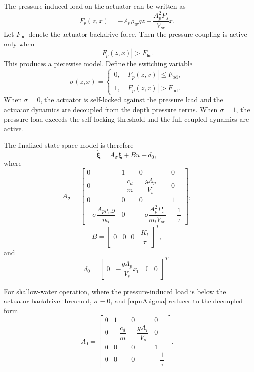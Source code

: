 ﻿\documentclass[subscriptcorrection,upint,varvw,barcolor=Goldenrod3,mathalfa=cal=euler,balance,hyphenate,french,pdf-a]{asmejour}
\begin{document}
The pressure-induced load on the actuator can be written as
\begin{equation}
    F_p(z,x)=-A_p\rho_wgz-\frac{A_p^2P_s}{V_{se}}x.
    \label{eqn:pressure_load}
\end{equation}
Let \(F_{\mathrm{bd}}\) denote the actuator backdrive force. Then the pressure coupling is active only when
\[
    |F_p(z,x)|>F_{\mathrm{bd}}.
\]
This produces a piecewise model. Define the switching variable
\begin{equation}
    \sigma(z,x)=
    \begin{cases}
        0, & |F_p(z,x)|\leq F_{\mathrm{bd}},\\
        1, & |F_p(z,x)|>F_{\mathrm{bd}}.
    \end{cases}
    \label{eqn:switching_sigma}
\end{equation}
When \(\sigma=0\), the actuator is self-locked against the pressure load and the actuator dynamics are decoupled from the depth pressure terms. When \(\sigma=1\), the pressure load exceeds the self-locking threshold and the full coupled dynamics are active.

The finalized state-space model is therefore
\begin{equation}
    \dot{\boldsymbol{\xi}}=A_{\sigma}\boldsymbol{\xi}+Bu+d_0,
    \label{eqn:finalized_hybrid_model}
\end{equation}
where
\begin{equation}
    A_{\sigma}=\begin{bmatrix}
        0 & 1 & 0 & 0 \\
        0 & -\dfrac{c_d}{m} & -\dfrac{gA_p}{V_s} & 0 \\
        0 & 0 & 0 & 1 \\
        -\sigma\dfrac{A_p\rho_wg}{m_l} & 0 & -\sigma\dfrac{A_p^2P_s}{m_lV_{se}} & -\dfrac{1}{\tau}
    \end{bmatrix},
    \label{eqn:Asigma}
\end{equation}
\[
    B=\begin{bmatrix}0 & 0 & 0 & \dfrac{K_l}{\tau}\end{bmatrix}^T,
\]
and
\[
    d_0=\begin{bmatrix}0 & -\dfrac{gA_p}{V_s}x_0 & 0 & 0\end{bmatrix}^T.
\]

For shallow-water operation, where the pressure-induced load is below the actuator backdrive threshold, \(\sigma=0\), and \eqref{eqn:Asigma} reduces to the decoupled form
\begin{equation}
    A_{0}=\begin{bmatrix}
        0 & 1 & 0 & 0 \\
        0 & -\dfrac{c_d}{m} & -\dfrac{gA_p}{V_s} & 0 \\
        0 & 0 & 0 & 1 \\
        0 & 0 & 0 & -\dfrac{1}{\tau}
    \end{bmatrix}.
    \label{eqn:A0_decoupled}
\end{equation}
\end{document}
